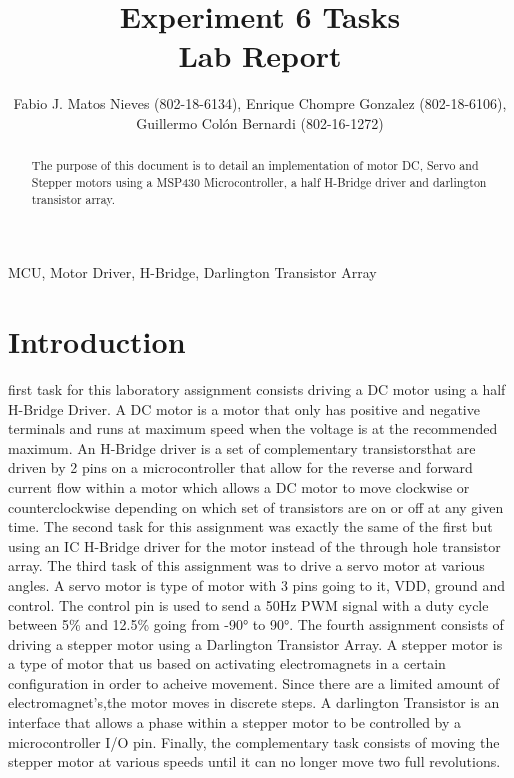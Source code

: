 \documentclass[journal]{IEEEtran}
\begin{document}
\title{Experiment 6 Tasks\\ Lab Report} \author{Fabio J. Matos
  Nieves (802-18-6134), Enrique Chompre Gonzalez (802-18-6106), \\Guillermo Colón Bernardi (802-16-1272)}
\maketitle
\begin{abstract}
  The purpose of this document is to detail an implementation of motor DC, Servo and Stepper motors using a MSP430 Microcontroller, a half H-Bridge driver and darlington transistor array.
\end{abstract}
\begin{IEEEkeywords}
  MCU, Motor Driver, H-Bridge, Darlington Transistor Array
\end{IEEEkeywords}
\IEEEpeerreviewmaketitle
\section{Introduction}
 first task for this laboratory assignment consists driving a DC motor using a half H-Bridge Driver. A DC motor is a motor that only has positive and negative terminals and runs at maximum speed when the voltage is at the recommended maximum. An H-Bridge driver is a set of complementary transistorsthat are driven by 2 pins on a microcontroller that allow for the reverse and forward current flow within a motor which allows a DC motor to move clockwise or counterclockwise depending on which set of transistors are on or off at any given time. The second task for this assignment was exactly the same of the first but using an IC H-Bridge driver for the motor instead of the through hole transistor array. The third task of this assignment was to drive a servo motor at various angles. A servo motor is type of motor with 3 pins going to it, VDD, ground and control. The control pin is used to send a 50\si{\Hz} PWM signal with a duty cycle between 5\% and 12.5\% going from \ang{-90} to \ang{90}. The fourth assignment consists of driving a stepper motor using a Darlington Transistor Array. A stepper motor is a type of motor that us based on activating electromagnets in a certain configuration in order to acheive movement. Since there are a limited amount of electromagnet's,the motor moves in discrete steps. A darlington Transistor is an interface that allows a phase within a stepper motor to be controlled by a microcontroller I/O pin. Finally, the complementary task consists of moving the stepper motor at various speeds until it can no longer move two full revolutions.
\end{document}
